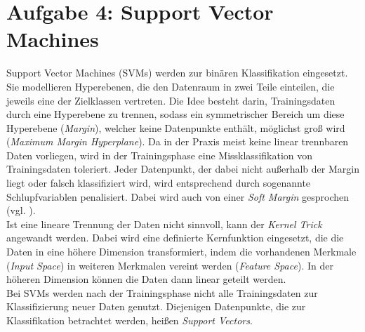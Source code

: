 \section{Aufgabe 4: Support Vector Machines}
Support Vector Machines (SVMs) werden zur binären Klassifikation eingesetzt. Sie modellieren Hyperebenen, die den Datenraum in zwei Teile einteilen, die jeweils eine der Zielklassen vertreten. Die Idee besteht darin, Trainingsdaten durch eine Hyperebene zu trennen, sodass ein symmetrischer Bereich um diese Hyperebene (\emph{Margin}), welcher keine Datenpunkte enthält, möglichst groß wird (\emph{Maximum Margin Hyperplane}). Da in der Praxis meist keine linear trennbaren Daten vorliegen, wird in der Trainingsphase eine Missklassifikation von Trainingsdaten toleriert. Jeder Datenpunkt, der dabei nicht außerhalb der Margin liegt oder falsch klassifiziert wird, wird entsprechend durch sogenannte Schlupfvariablen penalisiert. Dabei wird auch von einer \emph{Soft Margin} gesprochen (vgl. \cite{2015_aggarwal}).\\
\noindent \hspace*{7mm}
Ist eine lineare Trennung der Daten nicht sinnvoll, kann der \emph{Kernel Trick} angewandt werden. Dabei wird eine definierte Kernfunktion eingesetzt, die die Daten in eine höhere Dimension transformiert, indem die vorhandenen Merkmale (\emph{Input Space}) in weiteren Merkmalen vereint werden (\emph{Feature Space}). In der höheren Dimension können die Daten dann linear geteilt werden.\\
\noindent \hspace*{7mm}
Bei SVMs werden nach der Trainingsphase nicht alle Trainingsdaten zur Klassifizierung neuer Daten genutzt. Diejenigen Datenpunkte, die zur Klassifikation betrachtet werden, heißen \emph{Support Vectors}.
